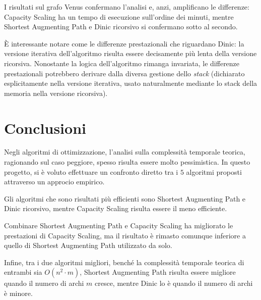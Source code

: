 \documentclass[11pt]{report}
\begin{document}
    I risultati sul grafo Venus confermano l'analisi e, anzi, amplificano le differenze: Capacity Scaling ha un tempo di esecuzione sull'ordine dei minuti, mentre Shortest Augmenting Path e Dinic ricorsivo si confermano sotto al secondo.

    È interessante notare come le differenze prestazionali che riguardano Dinic: la versione iterativa dell'algoritmo risulta essere decisamente più lenta della versione ricorsiva.
    Nonostante la logica dell'algoritmo rimanga invariata, le differenze prestazionali potrebbero derivare dalla diversa gestione dello \textit{stack} (dichiarato esplicitamente nella versione iterativa, usato naturalmente mediante lo stack della memoria nella versione ricorsiva).

    \chapter{Conclusioni}\label{ch:conclusioni}
    Negli algoritmi di ottimizzazione, l'analisi sulla complessità temporale teorica, ragionando sul caso peggiore, spesso risulta essere molto pessimistica.
    In questo progetto, si è voluto effettuare un confronto diretto tra i $5$ algoritmi proposti attraverso un approcio empirico.

    Gli algoritmi che sono risultati più efficienti sono Shortest Augmenting Path e Dinic ricorsivo, mentre Capacity Scaling risulta essere il meno efficiente.

    Combinare Shortest Augmenting Path e Capacity Scaling ha migliorato le prestazioni di Capacity Scaling, ma il risultato è rimasto comunque inferiore a quello di Shortest Augmenting Path utilizzato da solo.

    Infine, tra i due algoritmi migliori, benché la complessità temporale teorica di entrambi sia $O(n^2\cdot m)$, Shortest Augmenting Path risulta essere migliore quando il numero di archi $m$ cresce, mentre Dinic lo è quando il numero di archi è minore.

    \printbibliography
\end{document}
